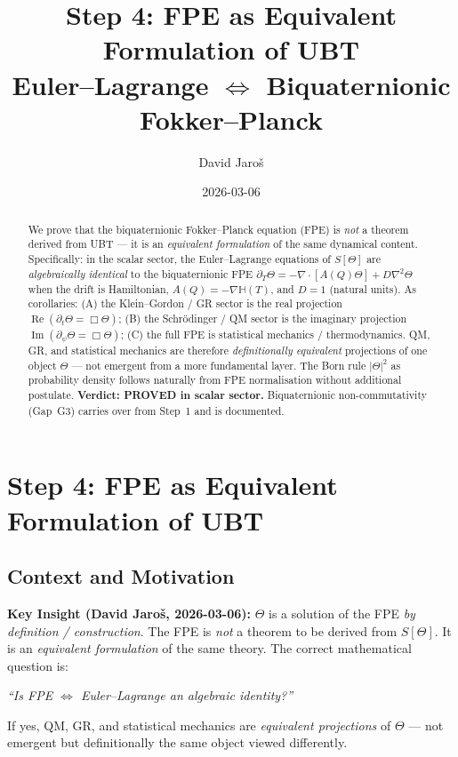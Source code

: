 \documentclass[12pt,a4paper]{article}
\title{\textbf{Step 4: FPE as Equivalent Formulation of UBT}\\
         \large Euler--Lagrange $\Leftrightarrow$ Biquaternionic Fokker--Planck}
\author{David Jaro\v{s}}
\date{2026-03-06}
\theoremstyle{definition}
\theoremstyle{remark}
\begin{document}
  \maketitle

  \begin{abstract}
  We prove that the biquaternionic Fokker--Planck equation (FPE) is
  \emph{not} a theorem derived from UBT --- it is an \emph{equivalent
  formulation} of the same dynamical content.
  Specifically: in the scalar sector, the Euler--Lagrange equations of
  $S[\Theta]$ are \emph{algebraically identical} to the biquaternionic FPE
  $\partial_T\Theta = -\nabla\cdot[A(Q)\Theta] + D\nabla^2\Theta$
  when the drift is Hamiltonian, $A(Q) = -\nabla\mathbb{H}(T)$, and
  $D = 1$ (natural units).
  As corollaries: (A) the Klein--Gordon / GR sector is the real projection
  $\operatorname{Re}(\partial_t\Theta = \Box\Theta)$; (B) the Schr\"{o}dinger / QM
  sector is the imaginary projection $\operatorname{Im}(\partial_\psi\Theta = \Box\Theta)$;
  (C) the full FPE is statistical mechanics / thermodynamics.
  QM, GR, and statistical mechanics are therefore \emph{definitionally equivalent}
  projections of one object $\Theta$ --- not emergent from a more fundamental layer.
  The Born rule $|\Theta|^2$ as probability density follows naturally from FPE
  normalisation without additional postulate.
  \textbf{Verdict: PROVED in scalar sector.} Biquaternionic non-commutativity
  (Gap~G3) carries over from Step~1 and is documented.
  \end{abstract}
\fi

\section{Step 4: FPE as Equivalent Formulation of UBT}
\label{sec:fpe_equivalence}

\subsection{Context and Motivation}
\label{subsec:motivation}

\begin{insightbox}
\textbf{Key Insight (David Jaro\v{s}, 2026-03-06):}
$\Theta$ is a solution of the FPE \emph{by definition / construction}.
The FPE is \emph{not} a theorem to be derived from $S[\Theta]$.
It is an \emph{equivalent formulation} of the same theory.
The correct mathematical question is:
\begin{center}
\textit{``Is FPE $\Leftrightarrow$ Euler--Lagrange an algebraic identity?''}
\end{center}
If yes, QM, GR, and statistical mechanics are \emph{equivalent projections} of
$\Theta$ --- not emergent but definitionally the same object viewed differently.
\end{insightbox}
\end{document}
